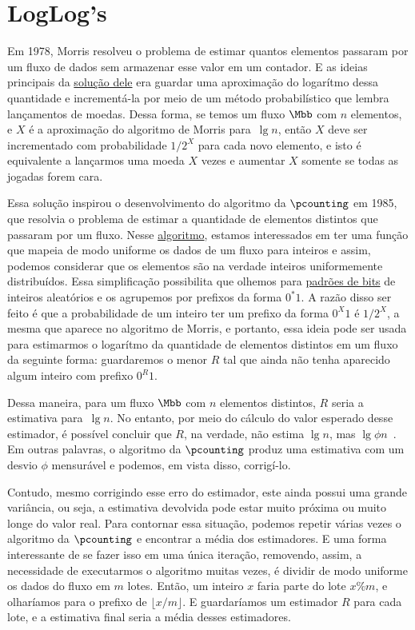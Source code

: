 \newcommand{\LOG}{\proc{LogLog}}

\chapter{LogLog's}

Em 1978, Morris resolveu o problema de estimar quantos elementos passaram por um fluxo de dados sem armazenar esse valor 
em um contador. E as ideias principais da \hyperref[chap:morris:algorithm]{solução dele} era guardar uma aproximação do 
logarítmo dessa quantidade e incrementá-la por meio de um método probabilístico que lembra lançamentos de moedas. Dessa 
forma, se temos um fluxo $\Mbb$ com $n$ elementos, e $X$ é a aproximação do algoritmo de Morris para~$\lg n$, então $X$ 
deve ser incrementado com probabilidade $1 / 2^X$ para cada novo elemento, e isto é equivalente a lançarmos uma moeda 
$X$ vezes e aumentar $X$ somente se todas as jogadas forem cara. 

Essa solução inspirou o desenvolvimento do algoritmo da $\pcounting$ em 1985, que resolvia o problema de estimar a 
quantidade de elementos distintos que passaram por um fluxo. Nesse \hyperref[sec:flajolet-martin:algorithm]{algoritmo}, 
estamos interessados em ter uma função que mapeia de modo uniforme os dados de um fluxo para inteiros e assim, podemos 
considerar que os elementos são na verdade inteiros uniformemente distribuídos. Essa simplificação possibilita que 
olhemos para \hyperref[sec:flajolet-martin:pattern]{padrões de bits} de inteiros aleatórios e os agrupemos por prefixos 
da forma $0^{*}1$. A razão disso ser feito é que a probabilidade de um inteiro ter um prefixo da forma $0^{X}1$ é 
$1 / 2^{X}$, a mesma que aparece no algoritmo de Morris, e portanto, essa ideia pode ser usada para estimarmos o 
logarítmo da quantidade de elementos distintos em um fluxo da seguinte forma: guardaremos o menor $R$ tal que ainda não 
tenha aparecido algum inteiro com prefixo $0^{R}1$.

Dessa maneira, para um fluxo $\Mbb$ com $n$ elementos distintos, $R$ seria a estimativa para~$\lg n$. No entanto, por 
meio do cálculo do valor esperado desse estimador, é possível concluir que $R$, na verdade, não estima $\lg n$, mas 
$\lg \phi n$~\citep{flajolet:martin:85}. Em outras palavras, o algoritmo da $\pcounting$ produz uma estimativa com um 
desvio $\phi$ mensurável e podemos, em vista disso, corrigí-lo.

Contudo, mesmo corrigindo esse erro do estimador, este ainda possui uma grande variância, ou seja, a estimativa 
devolvida pode estar muito próxima ou muito longe do valor real. Para contornar essa situação, podemos repetir várias 
vezes o algoritmo da $\pcounting$ e encontrar a média dos estimadores. E uma forma interessante de se fazer isso em uma 
única iteração, removendo, assim, a necessidade de executarmos o algoritmo muitas vezes, é dividir de modo uniforme os 
dados do fluxo em $m$ lotes. Então, um inteiro $x$ faria parte do lote $x \% m$, e olharíamos para o prefixo de 
$\lfloor x / m \rfloor$. E guardaríamos um estimador $R$ para cada lote, e a estimativa final seria a média desses 
estimadores.

